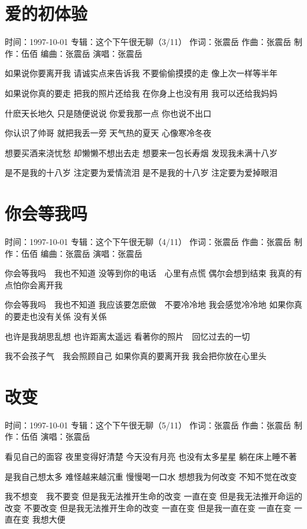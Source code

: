 \documentclass[UTF8,a4paper,oneside,twocolumn,12pt]{ctexbook}
\newcommand{\infopair}[2]{\textbullet #1：#2}
\newcommand{\zc}[1][伍佰]{\infopair{作词}{#1}}
\newcommand{\zq}[1][伍佰]{\infopair{作曲}{#1}}
\newcommand{\bq}[1][伍佰]{\infopair{编曲}{#1}}
\newcommand{\zj}[1]{\infopair{专辑}{#1}}
\newcommand{\zz}[1]{\infopair{制作}{#1}}
\newcommand{\sj}[1]{\infopair{时间}{#1}}
\newenvironment{info}{\begin{flushleft}\kaishu
	}
	{\end{flushleft}\normalsize\yahei\par}
\newenvironment{lyric}{
	}
{}
\begin{document}
\section{爱的初体验}
\begin{info}
	\sj{1997-10-01}
	\zj{这个下午很无聊（3/11）}
	\zc[张震岳]
	\zq[张震岳]
	\zz{伍佰}
	\bq[张震岳]
	\infopair{演唱}{张震岳}
\end{info}
\begin{lyric}
	如果说你要离开我
	请诚实点来告诉我
	不要偷偷摸摸的走
	像上次一样等半年

	如果说你真的要走
	把我的照片还给我
	在你身上也没有用
	我可以还给我妈妈

	什麽天长地久
	只是随便说说
	你爱我那一点
	你也说不出口

	你认识了帅哥
	就把我丢一旁
	天气热的夏天
	心像寒冷冬夜

	想要买酒来浇忧愁
	却懒懒不想出去走
	想要来一包长寿烟
	发现我未满十八岁

	是不是我的十八岁
	注定要为爱情流泪
	是不是我的十八岁
	注定要为爱掉眼泪
\end{lyric}

\section{你会等我吗}
\begin{info}
	\sj{1997-10-01}
	\zj{这个下午很无聊（4/11）}
	\zc[张震岳]
	\zq[张震岳]
	\zz{伍佰}
	\bq[张震岳]
	\infopair{演唱}{张震岳}
\end{info}
\begin{lyric}
	你会等我吗　我也不知道
	没等到你的电话　心里有点慌
	偶尔会想到结束 我真的有点怕你会离开我

	你会等我吗　我也不知道
	我应该要怎麽做　不要冷冷地
	我会感觉冷冷地 如果你真的要走也没有关係
	没有关係

	也许是我胡思乱想 也许距离太遥远
	看著你的照片　回忆过去的一切

	我不会孩子气　我会照顾自己
	如果你真的要离开我
	我会把你放在心里头
\end{lyric}

\section{改变}
\begin{info}
	\sj{1997-10-01}
	\zj{这个下午很无聊（5/11）}
	\zc[张震岳]
	\zq[张震岳]
	\zz{伍佰}
	\infopair{演唱}{张震岳}
\end{info}
\begin{lyric}
	看见自己的面容 夜里变得好清楚
	今天没有月亮 也没有太多星星
	躺在床上睡不著

	是我自己想太多 难怪越来越沉重
	慢慢喝一口水 想想我为何改变
	不知不觉在改变

	我不想变　我不要变
	但是我无法推开生命的改变 一直在变
	但是我无法推开命运的改变 不要改变
	但是我无法推开生命的改变 一直在变
	但是我一直在变 一直在变
	一直在变 我想大便
\end{lyric}
\end{document}
